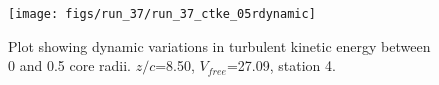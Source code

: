 \begin{figure}[H]
\centering
\texttt{[image: figs/run\_37/run\_37\_ctke\_05rdynamic]}
\caption{Plot showing dynamic variations in turbulent kinetic energy between 0 and 0.5 core radii. $z/c$=8.50, $V_{free}$=27.09, station 4.}
\label{fig:run_37_ctke_05rdynamic}
\end{figure}


